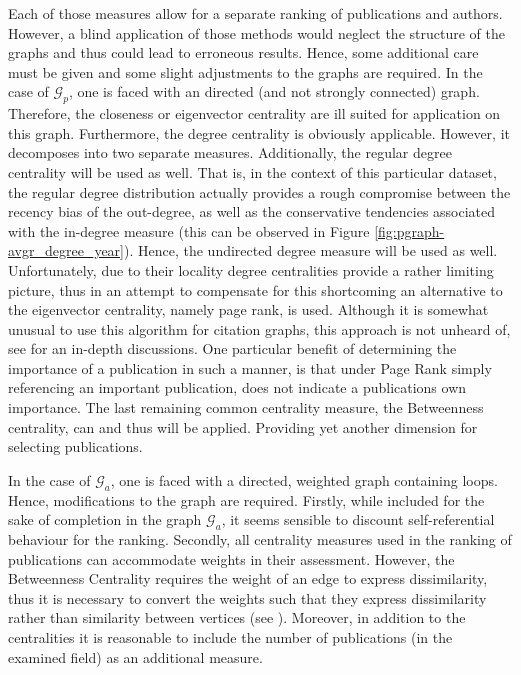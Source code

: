 \documentclass[11pt,a4paper]{book}
\theoremstyle{definition}
\theoremstyle{definition}
\theoremstyle{definition}
\theoremstyle{remark}
\newcommand{\pgraph}{\mathcal{G}_{p}}
\newcommand{\agraph}{\mathcal{G}_{a}}
\begin{document}
Each of those measures allow for a separate ranking of publications and authors. 
However, a blind application of those methods would neglect the structure of the graphs and thus could lead to erroneous results. Hence, some additional care must be given and some slight adjustments to the graphs are required.
In the case of $\pgraph$, one is faced with an directed (and not strongly connected) graph. Therefore, the closeness or eigenvector centrality are ill suited for application on this graph.
Furthermore, the degree centrality is obviously applicable. However, it decomposes into two separate measures. Additionally, the regular degree centrality will be used as well. That is, in the context of this particular dataset, the regular degree distribution actually provides a rough compromise between the recency bias of the out-degree, as well as the conservative tendencies associated with the in-degree measure (this can be observed in Figure \ref{fig:pgraph-avgr_degree_year}). Hence, the undirected degree measure will be used as well. Unfortunately, due to their locality degree centralities provide a rather limiting picture, thus in an attempt to compensate for this shortcoming an alternative to the eigenvector centrality, namely page rank, is used. Although it is somewhat unusual to use this algorithm for citation graphs, this approach is not unheard of, see \parencite{ding2009pagerank,ma2008bringing,chen2007finding,maslov2008promise,nykl2014pagerank} for an in-depth discussions. One particular benefit of determining the importance of a publication in such a manner, is that under Page Rank simply referencing an important publication, does not indicate a publications own importance. The last remaining common centrality measure, the Betweenness centrality, can and thus will be applied. Providing yet another dimension for selecting publications. 


In the case of $\agraph$, one is faced with a directed, weighted graph containing loops. Hence, modifications to the graph are required. Firstly, while included for the sake of completion in the graph $\agraph$, it seems sensible to discount self-referential behaviour for the ranking. Secondly, all centrality measures used in the ranking of publications
can accommodate weights in their assessment. However, the Betweenness Centrality requires the weight of an edge to express dissimilarity, thus it is necessary to convert the weights such that they express dissimilarity rather than similarity between vertices (see \cite[p.~13]{runkler2012data}). Moreover, in addition to the centralities it is reasonable to include the number of publications (in the examined field) as an additional measure. 
\end{document}
